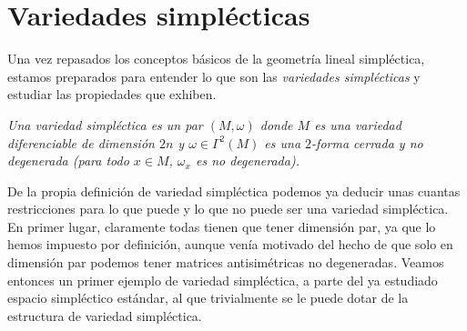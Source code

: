 \section{Variedades simplécticas}\label{sec:variedades}
Una vez repasados los conceptos básicos de la geometría lineal simpléctica, estamos preparados para entender lo que son las \emph{variedades simplécticas} y estudiar las propiedades que exhiben.
\begin{defn}
  \em
  Una \emph{variedad simpléctica} es un par $(M,\omega)$ donde $M$ es una variedad diferenciable de dimensión $2n$ y $\omega \in \Gamma^2(M)$ es una $2$-forma cerrada y no degenerada (para todo $x \in M$, $\omega_x$ es no degenerada). 
\end{defn}

De la propia definición de variedad simpléctica podemos ya deducir unas cuantas restricciones para lo que puede y lo que no puede ser una variedad simpléctica. En primer lugar, claramente todas tienen que tener dimensión par, ya que lo hemos impuesto por definición, aunque venía motivado del hecho de que solo en dimensión par podemos tener matrices antisimétricas no degeneradas. Veamos entonces un primer ejemplo de variedad simpléctica, a parte del ya estudiado espacio simpléctico estándar, al que trivialmente se le puede dotar de la estructura de variedad simpléctica.

